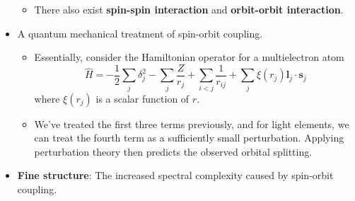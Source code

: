 \documentclass[../notes.tex]{subfiles}
\begin{document}
\begin{itemize}
\begin{itemize}
        \item There also exist \textbf{spin-spin interaction} and \textbf{orbit-orbit interaction}.
    \end{itemize}
    \item A quantum mechanical treatment of spin-orbit coupling.
    \begin{itemize}
        \item Essentially, consider the Hamiltonian operator for a multielectron atom
        \begin{equation*}
            \hat{H} = -\frac{1}{2}\sum_j\delta_j^2-\sum_j\frac{Z}{r_j}+\sum_{i<j}\frac{1}{r_{ij}}+\sum_j\xi(r_j)\mathbf{l}_j\cdot\mathbf{s}_j
        \end{equation*}
        where $\xi(r_j)$ is a scalar function of $r$.
        \item We've treated the first three terms previously, and for light elements, we can treat the fourth term as a sufficiently small perturbation. Applying perturbation theory then predicts the observed orbital splitting.
    \end{itemize}
    \item \textbf{Fine structure}: The increased spectral complexity caused by spin-orbit coupling.
\end{itemize}
\end{document}
